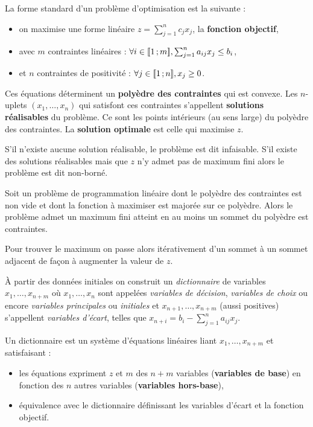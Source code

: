 La forme standard d'un problème d'optimisation est la suivante :
\begin{itemize}
	\item[\textbullet] on maximise une forme linéaire $z = \sum_{j = 1}^n c_j x_j$, la \textbf{fonction objectif},
	\item[\textbullet] avec $m$ contraintes linéaires : $\forall i \in \mathopen{[\![}1\mathclose{}\mathpunct{};m\mathclose{]\!]}, \sum_{j = 1}^n a_{ij}x_j \leq b_i$,
	\item[\textbullet] et $n$ contraintes de positivité : $\forall j \in \mathopen{[\![}1\mathclose{}\mathpunct{};n\mathclose{]\!]}, x_j \geq 0$.
\end{itemize}

Ces équations déterminent un \textbf{polyèdre des contraintes} qui est convexe.
Les $n$-uplets $(x_1,\ldots,x_n)$ qui satisfont ces contraintes s'appellent \textbf{solutions réalisables} du problème.
Ce sont les points intérieurs (au sens large) du polyèdre des contraintes.
La \textbf{solution optimale} est celle qui maximise $z$.

S'il n'existe aucune solution réalisable, le problème est dit infaisable.
S'il existe des solutions réalisables mais que $z$ n'y admet pas de maximum fini alors le problème est dit non-borné.

\begin{thm}
	Soit un problème de programmation linéaire dont le polyèdre des contraintes est non vide et dont la fonction à maximiser est majorée sur ce polyèdre.
	Alors le problème admet un maximum fini atteint en au moins un sommet du polyèdre est contraintes.
\end{thm}

Pour trouver le maximum on passe alors itérativement d'un sommet à un sommet adjacent de façon à augmenter la valeur de $z$.

À partir des données initiales on construit un \emph{dictionnaire} de variables $x_1, \ldots, x_{n + m}$ où $x_1, \ldots, x_n$ sont appelées \emph{variables de décision}, \emph{variables de choix} ou encore \emph{variables principales} ou \emph{initiales} et $x_{n + 1}, \ldots, x_{n + m}$ (aussi positives) s'appellent \emph{variables d'écart}, telles que $x_{n + i} = b_i - \sum_{j = 1}^n a_{ij} x_j$.

Un dictionnaire est un système d'équations linéaires liant $x_1, \ldots, x_{n + m}$ et satisfaisant :
\begin{itemize}
	\item[\textbullet] les équations expriment $z$ et $m$ des $n + m$ variables (\textbf{variables de base}) en fonction des $n$ autres variables (\textbf{variables hors-base}),
	\item[\textbullet] équivalence avec le dictionnaire définissant les variables d'écart et la fonction objectif.
\end{itemize}

